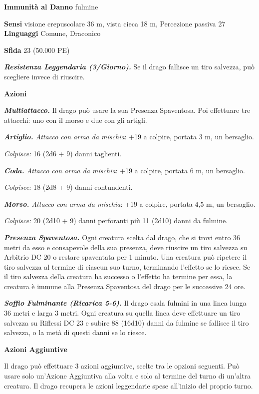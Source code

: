 \begin{multicols}{2}
\textbf{Immunità al Danno} fulmine

\textbf{Sensi} visione crepuscolare 36 m, vista cieca 18 m, Percezione passiva
27 \textbf{Linguaggi} Comune, Draconico

\textbf{Sfida} 23 (50.000 PE)

\emph{\textbf{Resistenza Leggendaria (3/Giorno).}} Se il drago fallisce
un tiro salvezza, può scegliere invece di riuscire.

\textbf{Azioni}

\emph{\textbf{Multiattacco.}} Il drago può usare la sua Presenza
Spaventosa. Poi effettuare tre attacchi: uno con il morso e due con gli
artigli.

\emph{\textbf{Artiglio.} Attacco con arma da mischia}: +19 a colpire,
portata 3 m, un bersaglio.

\emph{Colpisce:} 16 (2d6 + 9) danni taglienti.

\emph{\textbf{Coda.} Attacco con arma da mischia}: +19 a colpire,
portata 6 m, un bersaglio.

\emph{Colpisce:} 18 (2d8 + 9) danni contundenti.

\emph{\textbf{Morso.} Attacco con arma da mischia}: +19 a colpire,
portata 4,5 m, un bersaglio.

\emph{Colpisce:} 20 (2d10 + 9) danni perforanti più 11 (2d10) danni da
fulmine.

\emph{\textbf{Presenza Spaventosa.}} Ogni creatura scelta dal drago, che
si trovi entro 36 metri da esso e consapevole della sua presenza, deve
riuscire un tiro salvezza su Arbitrio DC 20 o restare spaventata per 1
minuto. Una creatura può ripetere il tiro salvezza al termine di ciascun
suo turno, terminando l'effetto se lo riesce. Se il tiro salvezza della
creatura ha successo o l'effetto ha termine per essa, la creatura è
immune alla Presenza Spaventosa del drago per le successive 24 ore.

\emph{\textbf{Soffio Fulminante (Ricarica 5-6).}} Il drago esala fulmini
in una linea lunga 36 metri e larga 3 metri. Ogni creatura su quella
linea deve effettuare un tiro salvezza su Riflessi DC 23 e subire 88
(16d10) danni da fulmine se fallisce il tiro salvezza, o la metà di
questi danni se lo riesce.

\textbf{Azioni Aggiuntive}

Il drago può effettuare 3 azioni aggiuntive, scelte tra le opzioni
seguenti. Può usare solo un'Azione Aggiuntiva alla volta e solo al
termine del turno di un'altra creatura. Il drago recupera le azioni
leggendarie spese all'inizio del proprio turno.


\end{multicols}
